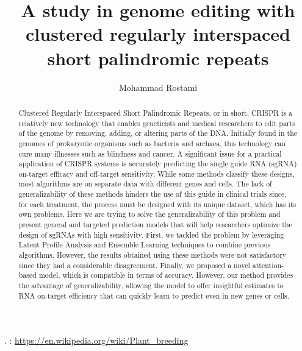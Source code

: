 \documentclass[12pt,a4paper,BCOR=.7cm,headsepline,bibliography=totoc]{report}
\begin{document}
\begin{thebibliography}{1}
\begin{latin}
. 
: \href{https://en.wikipedia.org/wiki/Plant_breeding}{\url{https://en.wikipedia.org/wiki/Plant_breeding}}
\end{latin}
\end{thebibliography}
\printindex
\begin{latin}
\begin{abstract}
Clustered Regularly Interspaced Short Palindromic Repeats, or in short, CRISPR is a relatively new
technology that enables geneticists and medical researchers to edit parts of the genome by removing,
adding, or altering parts of the DNA. Initially found in the genomes of prokaryotic organisms such as
bacteria and archaea, this technology can cure many illnesses such as blindness and cancer. A significant
issue for a practical application of CRISPR systems is accurately predicting the single guide RNA
(sgRNA) on-target efficacy and off-target sensitivity. While some methods classify these designs, most
algorithms are on separate data with different genes and cells. The lack of generalizability of these methods
hinders the use of this guide in clinical trials since, for each treatment, the process must be designed
with its unique dataset, which has its own problems. Here we are trying to solve the generalizability
of this problem and present general and targeted prediction models that will help researchers optimize
the design of sgRNAs with high sensitivity. First, we tackled the problem by leveraging Latent Profile
Analysis and Ensemble Learning techniques to combine previous algorithms. However, the results obtained
using these methods were not satisfactory since they had a considerable disagreement. Finally,
we proposed a novel attention-based model, which is compatible in terms of accuracy. However, our
method provides the advantage of generalizability, allowing the model to offer insightful estimates to
RNA on-target efficiency that can quickly learn to predict even in new genes or cells.
\end{abstract}
\end{latin}

\subject{‌Applied Mathematics}
\author{Mohammad Rostami}
\title{A study in genome editing with clustered regularly interspaced short palindromic repeats}
\date{\latintoday}
\makethesisenglishtitle
\end{document}
